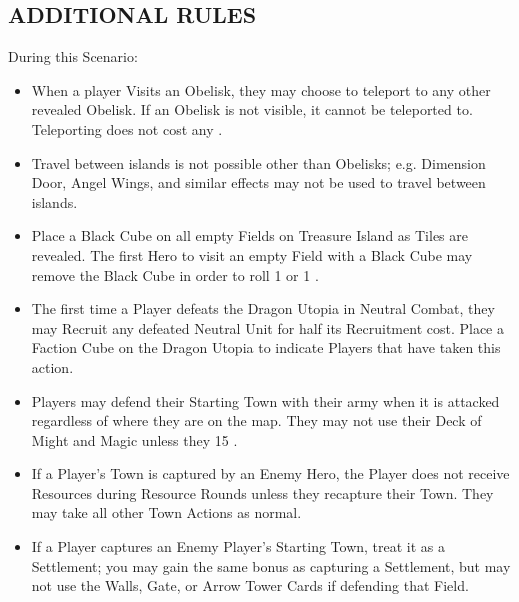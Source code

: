 \begin{multicols*}{2}
\subsection*{\MakeUppercase{Additional Rules}}

During this Scenario:

\begin{itemize}
  \item When a player Visits an Obelisk, they may choose to teleport to any other revealed Obelisk. If an Obelisk is not visible, it cannot be teleported to. Teleporting does not cost any .
  \item Travel between islands is not possible other than Obelisks; e.g. Dimension Door, Angel Wings, and similar effects may not be used to travel between islands.
  \item Place a Black Cube on all empty Fields on Treasure Island as Tiles are revealed. The first Hero to visit an empty Field with a Black Cube may remove the Black Cube in order to roll 1  or 1 .
  \item The first time a Player defeats the Dragon Utopia in Neutral Combat, they may Recruit any defeated Neutral Unit for half its Recruitment cost. Place a Faction Cube on the Dragon Utopia to indicate Players that have taken this action.
  \item Players may defend their Starting Town with their army when it is attacked regardless of where they are on the map. They may not use their Deck of Might and Magic unless they  15 .
  \item If a Player's Town is captured by an Enemy Hero, the Player does not receive Resources during Resource Rounds unless they recapture their Town. They may take all other Town Actions as normal.
  \item If a Player captures an Enemy Player's Starting Town, treat it as a Settlement; you may gain the same bonus as capturing a Settlement, but may not use the Walls, Gate, or Arrow Tower Cards if defending that Field.
\end{itemize}

\vspace*{\fill}

\begin{center}
\end{center}

\vspace*{\fill}

\end{multicols*}

